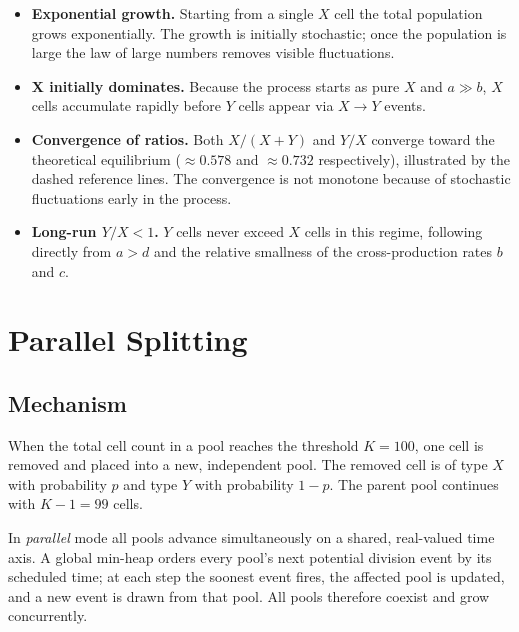 \documentclass[12pt]{article}
\begin{document}
\begin{itemize}
  \item \textbf{Exponential growth.}  Starting from a single $X$ cell the
        total population grows exponentially.  The growth is initially
        stochastic; once the population is large the law of large numbers
        removes visible fluctuations.

  \item \textbf{X initially dominates.}  Because the process starts as pure
        $X$ and $a \gg b$, $X$ cells accumulate rapidly before $Y$ cells
        appear via $X \to Y$ events.

  \item \textbf{Convergence of ratios.}  Both $X/(X+Y)$ and $Y/X$ converge
        toward the theoretical equilibrium ($\approx 0.578$ and
        $\approx 0.732$ respectively), illustrated by the dashed reference
        lines.  The convergence is not monotone because of stochastic
        fluctuations early in the process.

  \item \textbf{Long-run $Y/X < 1$.}  $Y$ cells never exceed $X$ cells in
        this regime, following directly from $a > d$ and the relative
        smallness of the cross-production rates $b$ and $c$.
\end{itemize}


\section{Parallel Splitting}
\label{sec:parallel}

\subsection{Mechanism}

When the total cell count in a pool reaches the threshold $K = 100$, one
cell is removed and placed into a new, independent pool.  The removed cell
is of type $X$ with probability $p$ and type $Y$ with probability $1-p$.
The parent pool continues with $K - 1 = 99$ cells.

In \emph{parallel} mode all pools advance simultaneously on a shared,
real-valued time axis.  A global min-heap orders every pool's next potential
division event by its scheduled time; at each step the soonest event fires,
the affected pool is updated, and a new event is drawn from that pool.
All pools therefore coexist and grow concurrently.
\end{document}
